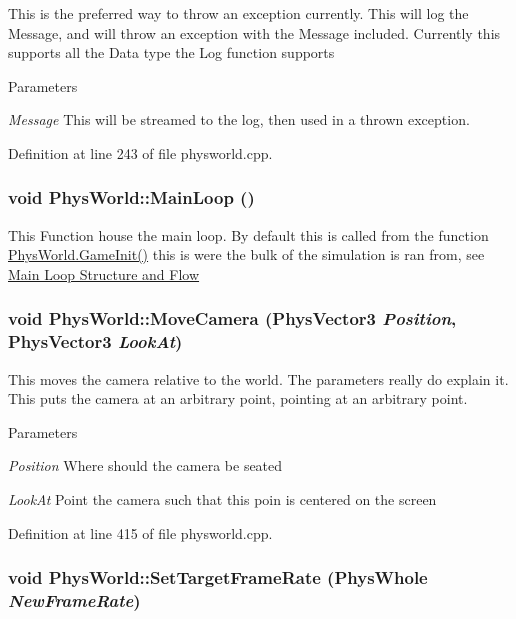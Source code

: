 This is the preferred way to throw an exception currently. This will log the Message, and will throw an exception with the Message included. Currently this supports all the Data type the Log function supports 
\begin{DoxyParams}{Parameters}
\item[{\em Message}]This will be streamed to the log, then used in a thrown exception. \end{DoxyParams}


Definition at line 243 of file physworld.cpp.\hypertarget{classPhysWorld_ad41cad0347b6f5ba7ec05568aaffa514}{
\subsubsection[{MainLoop}]{\setlength{\rightskip}{0pt plus 5cm}void PhysWorld::MainLoop ()}}
\label{db/df5/classPhysWorld_ad41cad0347b6f5ba7ec05568aaffa514}


This Function house the main loop. By default this is called from the function \hyperlink{classPhysWorld_afc5116f97cc1e91e899d1a1ca7e14e9b}{PhysWorld.GameInit()} this is were the bulk of the simulation is ran from, see \hyperlink{mainloop1}{Main Loop Structure and Flow} \hypertarget{classPhysWorld_a1df24ee06d5881825902b60e0d81174a}{
\subsubsection[{MoveCamera}]{\setlength{\rightskip}{0pt plus 5cm}void PhysWorld::MoveCamera ({\bf PhysVector3} {\em Position}, \/  {\bf PhysVector3} {\em LookAt})}}
\label{db/df5/classPhysWorld_a1df24ee06d5881825902b60e0d81174a}


This moves the camera relative to the world. The parameters really do explain it. This puts the camera at an arbitrary point, pointing at an arbitrary point. 
\begin{DoxyParams}{Parameters}
\item[{\em Position}]Where should the camera be seated \item[{\em LookAt}]Point the camera such that this poin is centered on the screen \end{DoxyParams}


Definition at line 415 of file physworld.cpp.\hypertarget{classPhysWorld_af68a05d6ee84d901bb3ed0e175daa662}{
\subsubsection[{SetTargetFrameRate}]{\setlength{\rightskip}{0pt plus 5cm}void PhysWorld::SetTargetFrameRate (PhysWhole {\em NewFrameRate})}}
\label{db/df5/classPhysWorld_af68a05d6ee84d901bb3ed0e175daa662}


